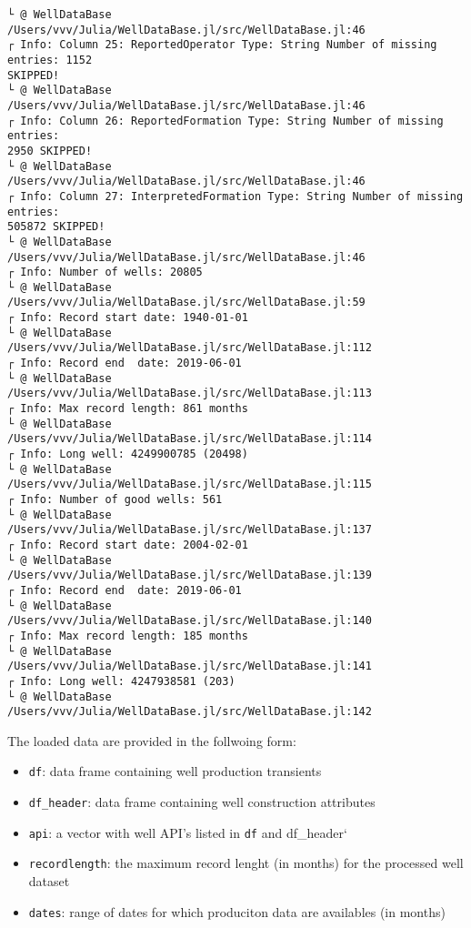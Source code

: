 \documentclass[11pt]{article}
\providecommand{\tightlist}{%
      \setlength{\itemsep}{0pt}\setlength{\parskip}{0pt}}
\begin{document}
\begin{Verbatim}[commandchars=\\\{\}]
└ @ WellDataBase /Users/vvv/Julia/WellDataBase.jl/src/WellDataBase.jl:46
┌ Info: Column 25: ReportedOperator Type: String Number of missing entries: 1152
SKIPPED!
└ @ WellDataBase /Users/vvv/Julia/WellDataBase.jl/src/WellDataBase.jl:46
┌ Info: Column 26: ReportedFormation Type: String Number of missing entries:
2950 SKIPPED!
└ @ WellDataBase /Users/vvv/Julia/WellDataBase.jl/src/WellDataBase.jl:46
┌ Info: Column 27: InterpretedFormation Type: String Number of missing entries:
505872 SKIPPED!
└ @ WellDataBase /Users/vvv/Julia/WellDataBase.jl/src/WellDataBase.jl:46
┌ Info: Number of wells: 20805
└ @ WellDataBase /Users/vvv/Julia/WellDataBase.jl/src/WellDataBase.jl:59
┌ Info: Record start date: 1940-01-01
└ @ WellDataBase /Users/vvv/Julia/WellDataBase.jl/src/WellDataBase.jl:112
┌ Info: Record end  date: 2019-06-01
└ @ WellDataBase /Users/vvv/Julia/WellDataBase.jl/src/WellDataBase.jl:113
┌ Info: Max record length: 861 months
└ @ WellDataBase /Users/vvv/Julia/WellDataBase.jl/src/WellDataBase.jl:114
┌ Info: Long well: 4249900785 (20498)
└ @ WellDataBase /Users/vvv/Julia/WellDataBase.jl/src/WellDataBase.jl:115
┌ Info: Number of good wells: 561
└ @ WellDataBase /Users/vvv/Julia/WellDataBase.jl/src/WellDataBase.jl:137
┌ Info: Record start date: 2004-02-01
└ @ WellDataBase /Users/vvv/Julia/WellDataBase.jl/src/WellDataBase.jl:139
┌ Info: Record end  date: 2019-06-01
└ @ WellDataBase /Users/vvv/Julia/WellDataBase.jl/src/WellDataBase.jl:140
┌ Info: Max record length: 185 months
└ @ WellDataBase /Users/vvv/Julia/WellDataBase.jl/src/WellDataBase.jl:141
┌ Info: Long well: 4247938581 (203)
└ @ WellDataBase /Users/vvv/Julia/WellDataBase.jl/src/WellDataBase.jl:142
    \end{Verbatim}

    The loaded data are provided in the follwoing form:

\begin{itemize}
\tightlist
\item
  \texttt{df}: data frame containing well production transients
\item
  \texttt{df\_header}: data frame containing well construction
  attributes
\item
  \texttt{api}: a vector with well API's listed in \texttt{df} and
  df\_header`
\item
  \texttt{recordlength}: the maximum record lenght (in months) for the
  processed well dataset
\item
  \texttt{dates}: range of dates for which produciton data are
  availables (in months)
\end{itemize}
\end{document}

